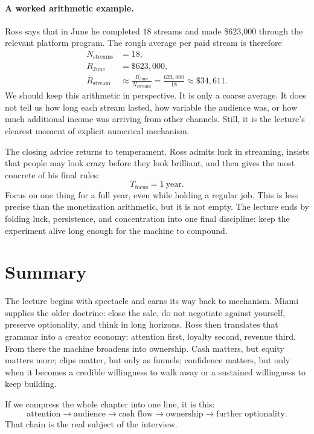 \paragraph{A worked arithmetic example.} Ross says that in June he completed \(18\) streams and made \$623{,}000 through the relevant platform program. The rough average per paid stream is therefore
\begin{align}
N_{\text{streams}} &= 18,\\
R_{\text{June}} &= \$623{,}000,\\
\bar R_{\text{stream}}
&\approx \frac{R_{\text{June}}}{N_{\text{streams}}}
= \frac{623{,}000}{18}
\approx \$34{,}611.
\end{align}
We should keep this arithmetic in perspective. It is only a coarse average. It does not tell us how long each stream lasted, how variable the audience was, or how much additional income was arriving from other channels. Still, it is the lecture's clearest moment of explicit numerical mechanism.

The closing advice returns to temperament. Ross admits luck in streaming, insists that people may look crazy before they look brilliant, and then gives the most concrete of his final rules:
\begin{equation}
T_{\text{focus}} = 1\ \text{year}.
\end{equation}
Focus on one thing for a full year, even while holding a regular job. This is less precise than the monetization arithmetic, but it is not empty. The lecture ends by folding luck, persistence, and concentration into one final discipline: keep the experiment alive long enough for the machine to compound.

\section{Summary}

The lecture begins with spectacle and earns its way back to mechanism. Miami supplies the older doctrine: close the sale, do not negotiate against yourself, preserve optionality, and think in long horizons. Ross then translates that grammar into a creator economy: attention first, loyalty second, revenue third. From there the machine broadens into ownership. Cash matters, but equity matters more; clips matter, but only as funnels; confidence matters, but only when it becomes a credible willingness to walk away or a sustained willingness to keep building.

If we compress the whole chapter into one line, it is this:
\[
\text{attention} \to \text{audience} \to \text{cash flow} \to \text{ownership} \to \text{further optionality}.
\]
That chain is the real subject of the interview.
